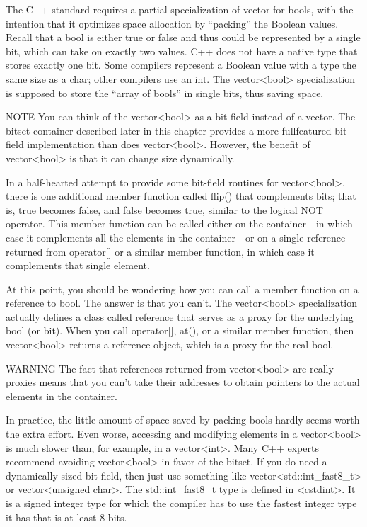 
The C++ standard requires a partial specialization of vector for bools, with the intention that it optimizes space allocation by “packing” the Boolean values. Recall that a bool is either true or false and thus could be represented by a single bit, which can take on exactly two values. C++ does not have a native type that stores exactly one bit. Some compilers represent a Boolean value with a type the same size as a char; other compilers use an int. The vector<bool> specialization is supposed to store the “array of bools” in single bits, thus saving space.

\begin{myNotic}{NOTE}
You can think of the vector<bool> as a bit-field instead of a vector. The bitset container described later in this chapter provides a more fullfeatured bit-field implementation than does vector<bool>. However, the benefit of vector<bool> is that it can change size dynamically.
\end{myNotic}

In a half-hearted attempt to provide some bit-field routines for vector<bool>, there is one additional member function called flip() that complements bits; that is, true becomes false, and false becomes true, similar to the logical NOT operator. This member function can be called either on the container—in which case it complements all the elements in the container—or on a single reference returned from operator[] or a similar member function, in which case it complements that single element.

At this point, you should be wondering how you can call a member function on a reference to bool. The answer is that you can’t. The vector<bool> specialization actually defines a class called reference that serves as a proxy for the underlying bool (or bit). When you call operator[], at(), or a similar member function, then vector<bool> returns a reference object, which is a proxy for the real bool.

\begin{myWarning}{WARNING}
The fact that references returned from vector<bool> are really proxies means that you can’t take their addresses to obtain pointers to the actual elements in the container.
\end{myWarning}

In practice, the little amount of space saved by packing bools hardly seems worth the extra effort. Even worse, accessing and modifying elements in a vector<bool> is much slower than, for example, in a vector<int>. Many C++ experts recommend avoiding vector<bool> in favor of the bitset. If you do need a dynamically sized bit field, then just use something like vector<std::int\_fast8\_t> or vector<unsigned char>. The std::int\_fast8\_t type is defined in <cstdint>. It is a signed integer type for which the compiler has to use the fastest integer type it has that is at least 8 bits.


